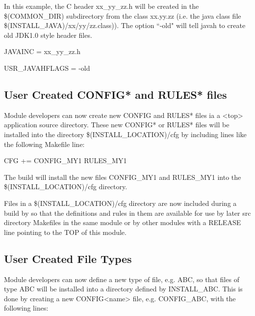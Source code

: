 In this example, the C header xx\_yy\_zz.h will be created in the \$(COMMON\_DIR) subdirectory from the class xx.yy.zz 
(i.e. the java class file \$(INSTALL\_JAVA)/xx/yy/zz.class)). The option ``-old" will tell javah to create old JDK1.0 style 
header files.

\begin{description}\item JAVAINC = xx\_yy\_zz.h

\item USR\_JAVAHFLAGS = -old

\end{description}\subsection{User Created CONFIG* and RULES* files}

Module developers can now create new CONFIG and RULES* files ia a \textless{}top\textgreater{} application source directory. These new 
CONFIG* or RULES* files will be installed into the directory \$(INSTALL\_LOCATION)/cfg by including lines like the 
following Makefile line:

\begin{description}\item       {}CFG += CONFIG\_MY1 RULES\_MY1

\end{description}The build will install the new files CONFIG\_MY1 and RULES\_MY1 into the \$(INSTALL\_LOCATION)/cfg directory.

Files in a \$(INSTALL\_LOCATION)/cfg directory are now included during a build by so that the definitions and rules in 
them are available for use by later src directory Makefiles in the same module or by other modules with a RELEASE line 
pointing to the TOP of this module.

\subsection{User Created File Types}

Module developers can now define a new type of file, e.g. ABC, so that files of type ABC will be installed into a directory 
defined by INSTALL\_ABC. This is done by creating a new CONFIG\textless{}name\textgreater{} file, e.g. CONFIG\_ABC, with the 
following lines:

